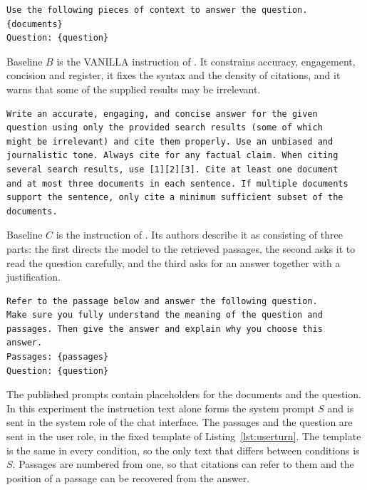\documentclass[12pt,a4paper,oneside]{scrreprt}
\begin{document}
\begin{lstlisting}[style=promptbox,caption={Baseline $A$: the response-generation prompt of \citet{friel2024ragbench}.},label={lst:minimal}]
Use the following pieces of context to answer the question.
{documents}
Question: {question}
\end{lstlisting}

Baseline $B$ is the VANILLA instruction of \citet{gao2023alce}. It constrains accuracy, engagement, concision and register, it fixes the syntax and the density of citations, and it warns that some of the supplied results may be irrelevant.

\begin{lstlisting}[style=promptbox,caption={Baseline $B$: the VANILLA instruction of \citet{gao2023alce}, reproduced from their Table 23.},label={lst:alce}]
Write an accurate, engaging, and concise answer for the given
question using only the provided search results (some of which
might be irrelevant) and cite them properly. Use an unbiased and
journalistic tone. Always cite for any factual claim. When citing
several search results, use [1][2][3]. Cite at least one document
and at most three documents in each sentence. If multiple documents
support the sentence, only cite a minimum sufficient subset of the
documents.
\end{lstlisting}

Baseline $C$ is the instruction of \citet{mao2024fitrag}. Its authors describe it as consisting of three parts: the first directs the model to the retrieved passages, the second asks it to read the question carefully, and the third asks for an answer together with a justification. 

\begin{lstlisting}[style=promptbox,caption={Baseline $C$: the comprehensive instruction of \citet{mao2024fitrag}.},label={lst:fitrag}]
Refer to the passage below and answer the following question.
Make sure you fully understand the meaning of the question and
passages. Then give the answer and explain why you choose this
answer.
Passages: {passages}
Question: {question}
\end{lstlisting}

The published prompts contain placeholders for the documents and the question. In this experiment the instruction text alone forms the system prompt $S$ and is sent in the system role of the chat interface. The passages and the question are sent in the user role, in the fixed template of Listing~\ref{lst:userturn}. The template is the same in every condition, so the only text that differs between conditions is $S$. Passages are numbered from one, so that citations can refer to them and the position of a passage can be recovered from the answer.
\end{document}
